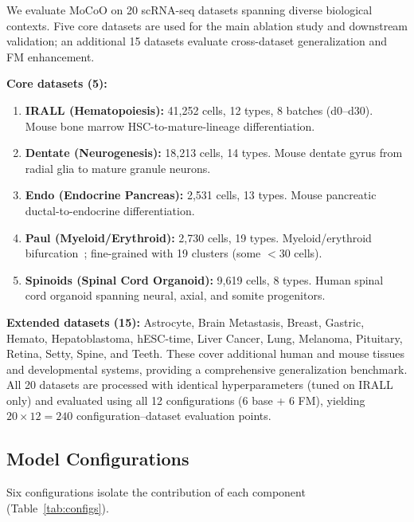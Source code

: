 \documentclass[biology,article,submit,pdftex]{Definitions/mdpi}
\begin{document}
We evaluate MoCoO on 20 scRNA-seq datasets spanning diverse biological contexts. Five core datasets are used for the main ablation study and downstream validation; an additional 15 datasets evaluate cross-dataset generalization and FM enhancement.

\textbf{Core datasets (5):}
\begin{enumerate}
    \item \textbf{IRALL (Hematopoiesis):} 41{,}252 cells, 12 types, 8 batches (d0--d30). Mouse bone marrow HSC-to-mature-lineage differentiation.
    \item \textbf{Dentate (Neurogenesis):} 18{,}213 cells, 14 types. Mouse dentate gyrus from radial glia to mature granule neurons.
    \item \textbf{Endo (Endocrine Pancreas):} 2{,}531 cells, 13 types. Mouse pancreatic ductal-to-endocrine differentiation.
    \item \textbf{Paul (Myeloid/Erythroid):} 2{,}730 cells, 19 types. Myeloid/erythroid bifurcation~\cite{paul2015transcriptional}; fine-grained with 19 clusters (some $< 30$ cells).
    \item \textbf{Spinoids (Spinal Cord Organoid):} 9{,}619 cells, 8 types. Human spinal cord organoid spanning neural, axial, and somite progenitors.
\end{enumerate}

\textbf{Extended datasets (15):} Astrocyte, Brain Metastasis, Breast, Gastric, Hemato, Hepatoblastoma, hESC-time, Liver Cancer, Lung, Melanoma, Pituitary, Retina, Setty, Spine, and Teeth. These cover additional human and mouse tissues and developmental systems, providing a comprehensive generalization benchmark. All 20 datasets are processed with identical hyperparameters (tuned on IRALL only) and evaluated using all 12 configurations (6 base + 6 FM), yielding $20 \times 12 = 240$ configuration--dataset evaluation points.

\subsection{Model Configurations}
\label{sec:experiments:configs}

Six configurations isolate the contribution of each component (Table~\ref{tab:configs}).
\end{document}
